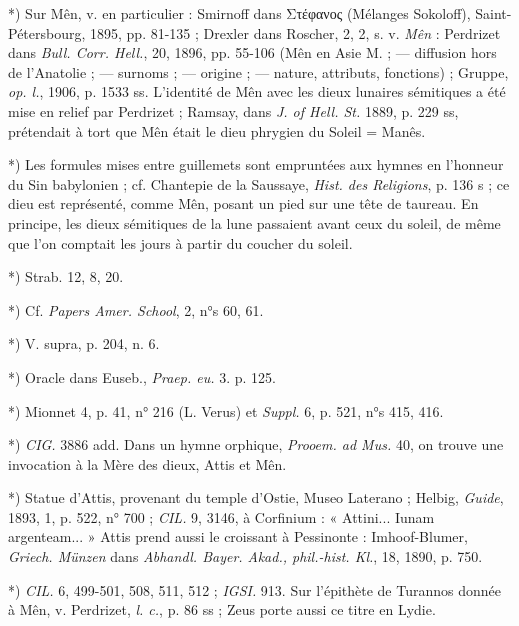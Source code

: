 \documentclass[a4paper, 11pt, oneside, polutonikogreek, french]{article}
\begin{document}
*) Sur Mên, v. en particulier : Smirnoff dans Στέφανος (Mélanges Sokoloff), Saint-Pétersbourg, 1895, pp. 81-135 ; Drexler dans Roscher, 2, 2, s. v. \emph{Mên} : Perdrizet dans \emph{Bull. Corr. Hell.}, 20, 1896, pp. 55-106 (Mên en Asie M. ; --- diffusion hors de l'Anatolie ; --- surnoms ; --- origine ; --- nature, attributs, fonctions) ; Gruppe, \emph{op. l.}, 1906, p. 1533 ss. L'identité de Mên avec les dieux lunaires sémitiques a été mise en relief par Perdrizet ; Ramsay, dans \emph{J. of Hell. St.} 1889, p. 229 ss, prétendait à tort que Mên était le dieu phrygien du Soleil = Manês.

*) Les formules mises entre guillemets sont empruntées aux hymnes en l'honneur du Sin babylonien ; cf. Chantepie de la Saussaye, \emph{Hist. des Religions}, p. 136 s ; ce dieu est représenté, comme Mên, posant un pied sur une tête de taureau. En principe, les dieux sémitiques de la lune passaient avant ceux du soleil, de même que l'on comptait les jours à partir du coucher du soleil.

*) Strab. 12, 8, 20.

*) Cf. \emph{Papers Amer. School}, 2, n°s 60, 61.

*) V. supra, p. 204, n. 6.

*) Oracle dans Euseb., \emph{Praep. eu.} 3. p. 125.

*) Mionnet 4, p. 41, n° 216 (L. Verus) et \emph{Suppl.} 6, p. 521, n°s 415, 416.

*) \emph{CIG.} 3886 add. Dans un hymne orphique, \emph{Prooem. ad Mus.} 40, on trouve une invocation à la Mère des dieux, Attis et Mên.

*) Statue d'Attis, provenant du temple d'Ostie, Museo Laterano ; Helbig, \emph{Guide}, 1893, 1, p. 522, n° 700 ; \emph{CIL.} 9, 3146, à Corfinium : « Attini... Iunam argenteam... » Attis prend aussi le croissant à Pessinonte : Imhoof-Blumer, \emph{Griech. Münzen} dans \emph{Abhandl. Bayer. Akad., phil.-hist. Kl.}, 18, 1890, p. 750.

*) \emph{CIL.} 6, 499-501, 508, 511, 512 ; \emph{IGSI.} 913. Sur l'épithète de Turannos donnée à Mên, v. Perdrizet, \emph{l. c.}, p. 86 ss ; Zeus porte aussi ce titre en Lydie.
\end{document}
